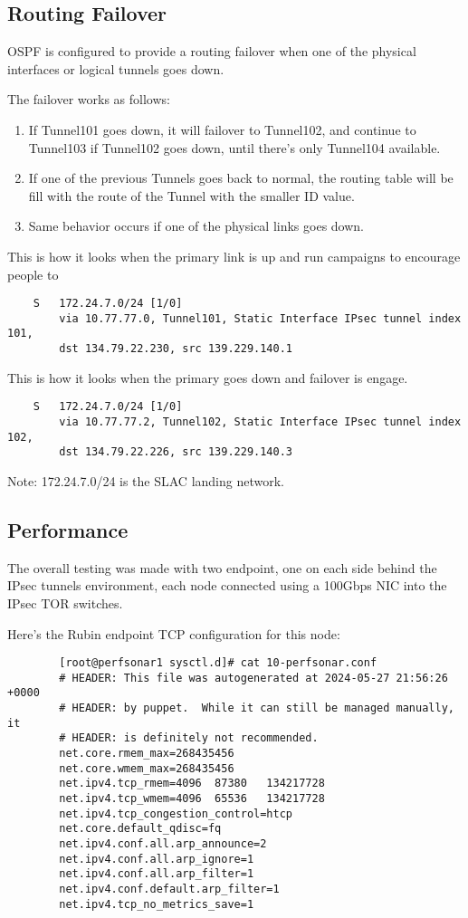 \subsection{Routing Failover}

OSPF is configured to provide a routing failover when one of the physical interfaces or logical tunnels goes down.

The failover works as follows:

    \begin{enumerate}
        \item If Tunnel101 goes down, it will failover to Tunnel102, and continue to Tunnel103 if Tunnel102 goes down, until there's only Tunnel104 available.
        \item If one of the previous Tunnels goes back to normal, the routing table will be fill with the route of the Tunnel with the smaller ID value.
        \item Same behavior occurs if one of the physical links goes down.
    \end{enumerate}

This is how it looks when the primary link is up and run campaigns to encourage people to
    \begin{lstlisting}
    S   172.24.7.0/24 [1/0]
        via 10.77.77.0, Tunnel101, Static Interface IPsec tunnel index 101, 
        dst 134.79.22.230, src 139.229.140.1
    \end{lstlisting}

This is how it looks when the primary goes down and failover is engage.
    \begin{lstlisting}
    S   172.24.7.0/24 [1/0]
        via 10.77.77.2, Tunnel102, Static Interface IPsec tunnel index 102, 
        dst 134.79.22.226, src 139.229.140.3
    \end{lstlisting}

Note: 172.24.7.0/24 is the SLAC landing network.

\subsection{Performance}
The overall testing was made with two endpoint, one on each side behind the IPsec tunnels environment, each node connected using a 100Gbps NIC into the IPsec TOR switches.

Here's the Rubin endpoint TCP configuration for this node:

    \begin{lstlisting}
        [root@perfsonar1 sysctl.d]# cat 10-perfsonar.conf 
        # HEADER: This file was autogenerated at 2024-05-27 21:56:26 +0000
        # HEADER: by puppet.  While it can still be managed manually, it
        # HEADER: is definitely not recommended.
        net.core.rmem_max=268435456
        net.core.wmem_max=268435456
        net.ipv4.tcp_rmem=4096	87380	134217728
        net.ipv4.tcp_wmem=4096	65536	134217728
        net.ipv4.tcp_congestion_control=htcp
        net.core.default_qdisc=fq
        net.ipv4.conf.all.arp_announce=2
        net.ipv4.conf.all.arp_ignore=1
        net.ipv4.conf.all.arp_filter=1
        net.ipv4.conf.default.arp_filter=1
        net.ipv4.tcp_no_metrics_save=1
        \end{lstlisting}

